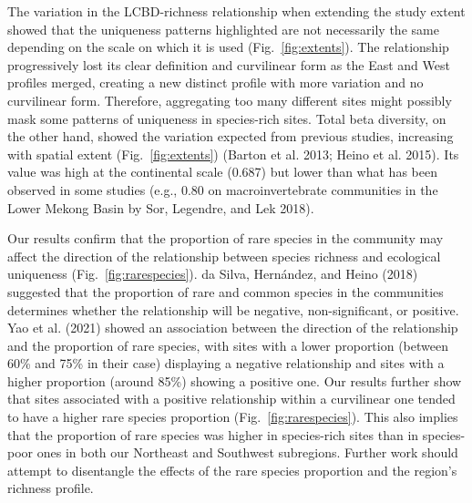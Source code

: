 \documentclass[11pt]{article}
\begin{document}
The variation in the LCBD-richness relationship when extending the study
extent showed that the uniqueness patterns highlighted are not
necessarily the same depending on the scale on which it is used
(Fig.~\ref{fig:extents}). The relationship progressively lost its clear
definition and curvilinear form as the East and West profiles merged,
creating a new distinct profile with more variation and no curvilinear
form. Therefore, aggregating too many different sites might possibly
mask some patterns of uniqueness in species-rich sites. Total beta
diversity, on the other hand, showed the variation expected from
previous studies, increasing with spatial extent
(Fig.~\ref{fig:extents}) (Barton et al. 2013; Heino et al. 2015). Its
value was high at the continental scale (0.687) but lower than what has
been observed in some studies (e.g., 0.80 on macroinvertebrate
communities in the Lower Mekong Basin by Sor, Legendre, and Lek 2018).

Our results confirm that the proportion of rare species in the community
may affect the direction of the relationship between species richness
and ecological uniqueness (Fig.~\ref{fig:rarespecies}). da Silva,
Hernández, and Heino (2018) suggested that the proportion of rare and
common species in the communities determines whether the relationship
will be negative, non-significant, or positive. Yao et al. (2021) showed
an association between the direction of the relationship and the
proportion of rare species, with sites with a lower proportion (between
60\% and 75\% in their case) displaying a negative relationship and
sites with a higher proportion (around 85\%) showing a positive one. Our
results further show that sites associated with a positive relationship
within a curvilinear one tended to have a higher rare species proportion
(Fig.~\ref{fig:rarespecies}). This also implies that the proportion of
rare species was higher in species-rich sites than in species-poor ones
in both our Northeast and Southwest subregions. Further work should
attempt to disentangle the effects of the rare species proportion and
the region's richness profile.
\end{document}
